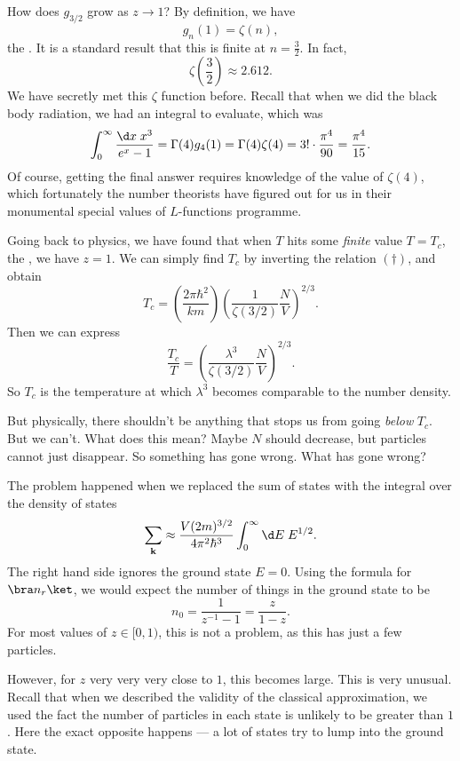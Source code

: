 \documentclass[a4paper]{article}
\begin{document}
How does $g_{3/2}$ grow as $z \to 1$? By definition, we have
\[
  g_n(1) = \zeta(n),
\]
the . It is a standard result that this is finite at $n = \frac{3}{2}$. In fact,
\[
  \zeta\left(\frac{3}{2}\right) \approx 2.612.
\]
We have secretly met this $\zeta$ function before. Recall that when we did the black body radiation, we had an integral to evaluate, which was
\[
  \int_0^\infty \frac{\d x\; x^3}{e^x - 1} = \Gamma(4) g_4(1) = \Gamma(4) \zeta(4) = 3! \cdot \frac{\pi^4}{90} = \frac{\pi^4}{15}.
\]
Of course, getting the final answer requires knowledge of the value of $\zeta(4)$, which fortunately the number theorists have figured out for us in their monumental special values of $L$-functions programme.

Going back to physics, we have found that when $T$ hits some \emph{finite} value $T = T_c$, the , we have $z = 1$. We can simply find $T_c$ by inverting the relation $(\dagger)$, and obtain
\[
  T_c = \left(\frac{2\pi \hbar^2}{k m}\right) \left(\frac{1}{\zeta(3/2)} \frac{N}{V}\right)^{2/3}.
\]
Then we can express
\[
  \frac{T_c}{T} = \left(\frac{\lambda^3}{\zeta(3/2)} \frac{N}{V}\right)^{2/3}.
\]
So $T_c$ is the temperature at which $\lambda^3$ becomes comparable to the number density.

But physically, there shouldn't be anything that stops us from going \emph{below} $T_c$. But we can't. What does this mean? Maybe $N$ should decrease, but particles cannot just disappear.
So something has gone wrong. What has gone wrong?

The problem happened when we replaced the sum of states with the integral over the density of states
\[
  \sum_\mathbf{k} \approx \frac{V(2m)^{3/2}}{4\pi^2 \hbar^3} \int_0^\infty \d E\; E^{1/2}.
\]
The right hand side ignores the ground state $E = 0$. Using the formula for $\bra n_r\ket$, we would expect the number of things in the ground state to be
\[
  n_0 = \frac{1}{z^{-1} - 1} = \frac{z}{1 - z}.
\]
For most values of $z \in [0, 1)$, this is not a problem, as this has just a few particles.

However, for $z$ very very very close to $1$, this becomes large. This is very unusual. Recall that when we described the validity of the classical approximation, we used the fact the number of particles in each state is unlikely to be greater than $1$. Here the exact opposite happens --- a lot of states try to lump into the ground state.
\end{document}
